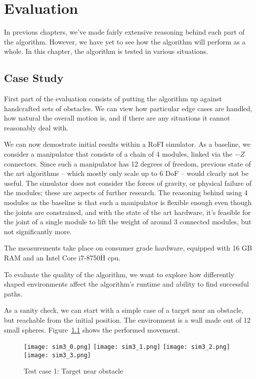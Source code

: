 \chapter{Evaluation}

In previous chapters, we've made fairly extensive reasoning behind each part of the algorithm. However, we have yet to see how the algorithm will perform as a whole. In this chapter, the algorithm is tested in various situations.

\section{Case Study}\label{study}

First part of the evaluation consists of putting the algorithm up against handcrafted sets of obstacles. We can view how particular edge cases are handled, how natural the overall motion is, and if there are any situations it cannot reasonably deal with.

We can now demostrate initial results within a RoFI simulator. As a baseline, we consider a manipulator that consists of a chain of 4 modules, linked via the $-Z$ connectors. Since such a manipulator has 12 degrees of freedom, previous state of the art algorithms -- which mostly only scale up to 6 DoF -- would clearly not be useful.
The simulator does not consider the forces of gravity, or physical failure of the modules; these are aspects of further research. The reasoning behind using 4 modules as the baseline is that such a manipulator is flexible enough even though the joints are constrained, and with the state of the art hardware, it's feasible for the joint of a single module to lift the weight of around 3 connected modules, but not significantly more.

The measurements take place on consumer grade hardware, equipped with 16 GB RAM and an Intel Core i7-8750H cpu.

To evaluate the quality of the algorithm, we want to explore how differently shaped environments affect the algorithm's runtime and ability to find successful paths.

As a sanity check, we can start with a simple case of a target near an obstacle, but reachable from the initial position. The environment is a wall made out of 12 small spheres. Figure~\ref{fig:sim3} shows the performed movement.

\begin{figure}
  \centering
  \begin{minipage}{\textwidth}
    \texttt{[image: sim3\_0.png]}
    \texttt{[image: sim3\_1.png]}
    \texttt{[image: sim3\_2.png]}
    \texttt{[image: sim3\_3.png]}
  \end{minipage}
  \caption{Test case 1: Target near obstacle}\label{fig:sim3}
\end{figure}

